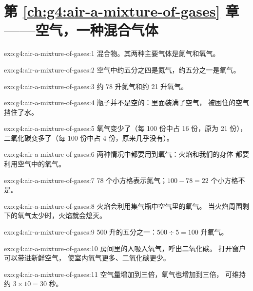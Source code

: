 \section*{第 \ref{ch:g4:air-a-mixture-of-gases} 章——空气，一种混合气体}

\begin{solution}{exo:g4:air-a-mixture-of-gases:1}
混合物。其两种主要气体是氮气和氧气。
\end{solution}

\begin{solution}{exo:g4:air-a-mixture-of-gases:2}
空气中约五分之四是氮气，约五分之一是氧气。
\end{solution}

\begin{solution}{exo:g4:air-a-mixture-of-gases:3}
约 78 升氮气和约 21 升氧气。
\end{solution}

\begin{solution}{exo:g4:air-a-mixture-of-gases:4}
瓶子并不是空的：里面装满了空气，
被困住的空气挡住了水。
\end{solution}

\begin{solution}{exo:g4:air-a-mixture-of-gases:5}
氧气变少了（每 100 份中占 16 份，原为 21 份），
二氧化碳变多了（每 100 份中占 4 份，原来几乎没有）。
\end{solution}

\begin{solution}{exo:g4:air-a-mixture-of-gases:6}
两种情况中都要用到氧气：火焰和我们的身体
都要利用空气中的氧气。
\end{solution}

\begin{solution}{exo:g4:air-a-mixture-of-gases:7}
78 个小方格表示氮气；$100 - 78 = 22$ 个小方格不是。
\end{solution}

\begin{solution}{exo:g4:air-a-mixture-of-gases:8}
火焰会利用集气瓶中空气里的氧气。
当火焰周围剩下的氧气太少时，火焰就会熄灭。
\end{solution}

\begin{solution}{exo:g4:air-a-mixture-of-gases:9}
500 升的五分之一：$500 \div 5 = 100$ 升氧气。
\end{solution}

\begin{solution}{exo:g4:air-a-mixture-of-gases:10}
房间里的人吸入氧气，呼出二氧化碳。
打开窗户可以带进新鲜空气，
使室内氧气更多、二氧化碳更少。
\end{solution}

\begin{solution}{exo:g4:air-a-mixture-of-gases:11}
空气量增加到三倍，氧气也增加到三倍，
可维持约 $3 \times 10 = 30$ 秒。
\end{solution}
